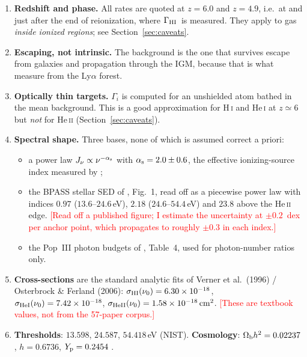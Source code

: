 \documentclass[11pt,a4paper]{article}
\newcommand{\GHI}{\ensuremath{\Gamma_{\rm HI}}}
\newcommand{\flag}[1]{\textcolor{red}{\textsf{[#1]}}}
\begin{document}
\begin{enumerate}[leftmargin=1.7em]
\item \textbf{Redshift and phase.} All rates are quoted at $z=6.0$ and $z=4.9$,
      i.e.\ at and just after the end of reionization, where \GHI\ is measured.
      They apply to gas \emph{inside ionized regions}; see
      Section~\ref{sec:caveats}.
\item \textbf{Escaping, not intrinsic.} The background is the one that survives
      escape from galaxies and propagation through the IGM, because that is
      what \citet{Gaikwad2023} measure from the Ly$\alpha$ forest.
\item \textbf{Optically thin targets.} $\Gamma_i$ is computed for an
      unshielded atom bathed in the mean background.  This is a good
      approximation for H\,\textsc{i} and He\,\textsc{i} at $z\simeq6$ but
      \emph{not} for He\,\textsc{ii} (Section~\ref{sec:caveats}).
\item \textbf{Spectral shape.} Three bases, none of which is assumed correct
      a priori:
      \begin{itemize}[nosep]
      \item[(A)] a power law $J_\nu\propto\nu^{-\alpha_{\rm s}}$ with
            $\alpha_{\rm s}=2.0\pm0.6$, the effective ionizing-source index
            measured by \citet{Gaikwad2023};
      \item[(B)] the BPASS stellar SED of \citet{Eide2020}, Fig.~1, read off as
            a piecewise power law with indices $0.97$ ($13.6$--$24.6\,$eV),
            $2.18$ ($24.6$--$54.4\,$eV) and $23.8$ above the He\,\textsc{ii}
            edge.  \flag{Read off a published figure; I estimate the
            uncertainty at $\pm0.2$~dex per anchor point, which propagates to
            roughly $\pm0.3$ in each index.}
      \item[(C)] the Pop~III photon budgets of \citet{Murphy2021}, Table~4,
            used for photon-number ratios only.
      \end{itemize}
\item \textbf{Cross-sections} are the standard analytic fits of
      Verner et al.\ (1996) / Osterbrock \& Ferland (2006):
      $\sigma_{\rm HI}(\nu_0)=6.30\times10^{-18}$,
      $\sigma_{\rm HeI}(\nu_0)=7.42\times10^{-18}$,
      $\sigma_{\rm HeII}(\nu_0)=1.58\times10^{-18}\,{\rm cm^2}$.
      \flag{These are textbook values, not from the 57-paper corpus.}
\item \textbf{Thresholds}: $13.598$, $24.587$, $54.418\,$eV (NIST).
      \textbf{Cosmology}: $\Omega_{\rm b}h^2=0.02237$, $h=0.6736$,
      $Y_{\rm p}=0.2454$ \citep{Planck2018}.
\end{enumerate}
\end{document}
